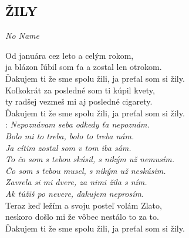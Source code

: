 \begin{flushleft}
	\section*{\Huge ŽILY}
	\emph{No Name}
\end{flushleft}

Od januára cez leto a celým rokom,\\
ja blázon ľúbil som ťa a zostal len otrokom.\\
Ďakujem ti že sme spolu žili, ja preťal som si žily.\\

Koľkokrát za posledné som ti kúpil kvety,\\
ty radšej vezmeš mi aj posledné cigarety.\\
Ďakujem ti že sme spolu žili, ja preťal som si žily.\\

\textregistered:
\emph{Nepoznávam seba odkedy ťa nepoznám.\\
Bolo mi to treba, bolo to treba nám.\\
Ja cítim zostal som v tom iba sám.\\

To čo som s tebou skúsil, s nikým už nemusím.\\
Čo som s tebou musel, s nikým už neskúsim.\\
Zavrela si mi dvere, za nimi žila s ním.\\
Ak túžiš po nevere, ďakujem neprosím}.\\

Teraz keď ležím a svoju posteľ volám Zlato,\\
neskoro došlo mi že vôbec nestálo to za to.\\
Ďakujem ti že sme spolu žili, ja preťal som si žily.

\textregistered
